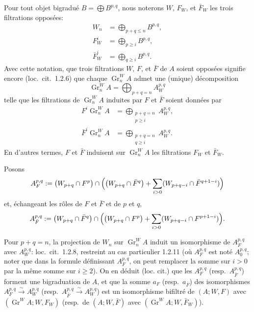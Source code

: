 \documentclass[12pt,a4paper]{article}
\theoremstyle{plain}
\theoremstyle{definition}
\DeclareMathOperator{\Gr}{Gr}
\begin{document}
Pour tout objet bigradu\'{e} $B = \bigoplus B^{p,q}$, nous noterons $W$, $F_W$, et $\bar{F}_W$
les trois filtrations oppos\'{e}es:
\begin{align*}
W_n &= \bigoplus_{p+q \leq n} B^{p,q}, \\
F_W^i &= \bigoplus_{p \geq i} B^{p,q}, \\
\bar{F}_W^i &= \bigoplus_{q \geq i} B^{p,q}.
\end{align*}
Avec cette notation, que trois filtrations $W$, $F$, et $\bar{F}$ de $A$ soient oppos\'{e}es
signifie encore (loc.~cit.~1.2.6) que chaque $\Gr_n^W A$ admet une (unique)
d\'{e}composition
\begin{equation*}
\Gr_n^W A = \bigoplus_{p+q=n} A_W^{p,q}
\end{equation*}
telle que les filtrations de $\Gr_n^W A$ induites par $F$ et $\bar{F}$ soient donn\'{e}es par
\begin{align*}
F^i \Gr_n^W A &= \bigoplus_{\substack{p+q=n \\ p \geq i}} A_W^{p,q}, \\
\bar{F}^i \Gr_n^W A &= \bigoplus_{\substack{p+q=n \\ q \geq i}} A_W^{p,q}.
\end{align*}
En d'autres termes, $F$ et $\bar{F}$ induisent sur $\Gr_n^W A$ les filtrations $F_W$ et $\bar{F}_W$.

Posons
\begin{equation*}
A_F^{p,q} := \bigl(W_{p+q} \cap F^p\bigr) \cap \Bigl( \bigl(W_{p+q} \cap \bar{F}^q\bigr) + \sum_{i>0} (W_{p+q-i} \cap \bar{F}^{q+1-i}) \Bigr)
\end{equation*}
et, \'{e}changeant les r\^{o}les de $F$ et $\bar{F}$ et de $p$ et $q$,
\begin{equation*}
A_{\bar{F}}^{p,q} := \bigl(W_{p+q} \cap \bar{F}^q\bigr) \cap \Bigl( \bigl(W_{p+q} \cap F^p\bigr) + \sum_{i>0} (W_{p+q-i} \cap F^{p+1-i}) \Bigr).
\end{equation*}

Pour $p+q=n$, la projection de $W_n$ sur $\Gr_n^W A$ induit un isomorphisme
de $A_F^{p,q}$ avec $A_W^{p,q}$: loc.~cit.~1.2.8, restreint au cas particulier 1.2.11 (o\`{u} $A_F^{p,q}$
est not\'{e} $A_0^{p,q}$; noter que dans la formule d\'{e}finissant $A_F^{p,q}$, on peut remplacer
la somme sur $i > 0$ par la m\^{e}me somme sur $i \geq 2$). On en d\'{e}duit (loc.
cit.) que les $A_F^{p,q}$ (resp.~$A_{\bar{F}}^{p,q}$) forment une bigraduation de $A$, et que la
somme $a_F$ (resp.~$a_{\bar{F}}$) des isomorphismes $A_F^{p,q} \xrightarrow{\sim} A_W^{p,q}$
(resp.~$A_{\bar{F}}^{p,q} \xrightarrow{\sim} A_W^{p,q}$)
est un isomorphisme bifiltr\'{e} de $(A; W, F)$ avec $(\Gr^W\!A; W, F_W)$ (resp.~de
$(A; W, \bar{F})$ avec $(\Gr^W\!A; W, \bar{F}_W)$).
\end{document}
